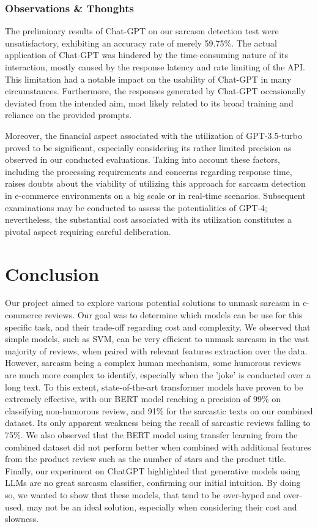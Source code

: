 \documentclass[10pt,twocolumn,letterpaper]{article}
\begin{document}
\subsubsection{Observations \& Thoughts}
The preliminary results of Chat-GPT on our sarcasm detection test were unsatisfactory, exhibiting an accuracy rate of merely 59.75\%.
The actual application of Chat-GPT was hindered by the time-consuming nature of its interaction, mostly caused by the response latency and rate limiting of the API. This limitation had a notable impact on the usability of Chat-GPT in many circumstances.
Furthermore, the responses generated by Chat-GPT occasionally deviated from the intended aim, most likely related to its broad training and reliance on the provided prompts.

Moreover, the financial aspect associated with the utilization of GPT-3.5-turbo proved to be significant, especially considering its rather limited precision as observed in our conducted evaluations.
Taking into account these factors, including the processing requirements and concerns regarding response time, raises doubts about the viability of utilizing this approach for sarcasm detection in e-commerce environments on a big scale or in real-time scenarios.
Subsequent examinations may be conducted to assess the potentialities of GPT-4; nevertheless, the substantial cost associated with its utilization constitutes a pivotal aspect requiring careful deliberation.


\section{Conclusion}

Our project aimed to explore various potential solutions to unmask sarcasm in e-commerce reviews.
Our goal was to determine which models can be use for this specific task, and their trade-off regarding cost and complexity.
We observed that simple models, such as SVM, can be very efficient to unmask sarcasm in the vast majority of reviews, when paired with relevant features extraction over the data.
However, sarcasm being a complex human mechanism, some humorous reviews are much more complex to identify, especially when the 'joke' is conducted over a long text.
To this extent, state-of-the-art transformer models have proven to be extremely effective, with our BERT model reaching a precision of 99\% on classifying non-humorous review, and 91\% for the sarcastic texts on our combined dataset.
Its only apparent weakness being the recall of sarcastic reviews falling to 75\%.
We also observed that the BERT model using transfer learning from the combined dataset did not perform better when combined with additional features from the product review such as the number of stars and the product title.
Finally, our experiment on ChatGPT highlighted that generative models using LLMs are no great sarcasm classifier, confirming our initial intuition.
By doing so, we wanted to show that these models, that tend to be over-hyped and over-used, may not be an ideal solution, especially when considering their cost and slowness.
\end{document}
